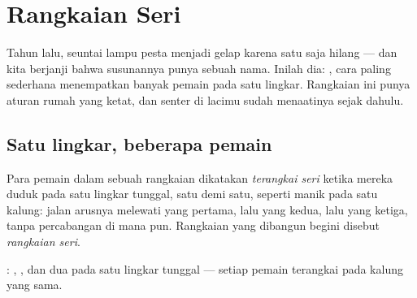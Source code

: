 \chapter{Rangkaian Seri}\label{ch:g4:series-circuits}

Tahun lalu, seuntai lampu pesta menjadi gelap karena satu  saja
hilang --- dan kita berjanji bahwa susunannya punya sebuah nama.
Inilah dia: , cara paling sederhana menempatkan banyak
pemain pada satu lingkar. Rangkaian ini punya aturan rumah yang ketat,
dan senter di lacimu sudah menaatinya sejak dahulu.

\section{Satu lingkar, beberapa pemain}

\begin{definition}\label{def:g4:series-circuits:series}
Para pemain dalam sebuah rangkaian dikatakan
\emph{terangkai seri} ketika mereka duduk pada
satu lingkar tunggal, satu demi satu, seperti manik pada satu kalung:
jalan arusnya melewati yang pertama, lalu yang kedua, lalu yang
ketiga, tanpa percabangan di mana pun. Rangkaian yang dibangun begini
disebut \emph{rangkaian seri}.
\end{definition}

\begin{omfigure}

{\small {}: , , dan dua  pada satu
lingkar tunggal --- setiap pemain terangkai pada kalung yang sama.}
\end{omfigure}

